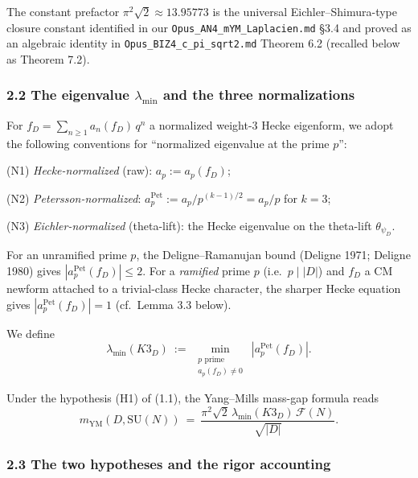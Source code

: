 \documentclass[
  11pt,
  a4paper,
]{amsart}
\begin{document}
The constant prefactor \(\pi^2 \sqrt{2} \approx 13.95773\) is the universal Eichler--Shimura-type closure constant identified in our \texttt{Opus\_AN4\_mYM\_Laplacien.md} §3.4 and proved as an algebraic identity in \texttt{Opus\_BIZ4\_c\_pi\_sqrt2.md} Theorem 6.2 (recalled below as Theorem 7.2).

\hypertarget{the-eigenvalue-lambda_min-and-the-three-normalizations}{%
\subsubsection{\texorpdfstring{2.2 The eigenvalue \(\lambda_{\min}\) and the three normalizations}{2.2 The eigenvalue \textbackslash lambda\_\{\textbackslash min\} and the three normalizations}}\label{the-eigenvalue-lambda_min-and-the-three-normalizations}}

For \(f_D = \sum_{n \ge 1} a_n(f_D)\, q^n\) a normalized weight-3 Hecke eigenform, we adopt the following conventions for ``normalized eigenvalue at the prime \(p\)'':

(N1) \emph{Hecke-normalized} (raw): \(a_p := a_p(f_D)\);

(N2) \emph{Petersson-normalized}: \(a_p^{\mathrm{Pet}} := a_p / p^{(k-1)/2} = a_p / p\) for \(k = 3\);

(N3) \emph{Eichler-normalized} (theta-lift): the Hecke eigenvalue on the theta-lift \(\theta_{\psi_D}\).

For an unramified prime \(p\), the Deligne--Ramanujan bound (Deligne 1971; Deligne 1980) gives \(|a_p^{\mathrm{Pet}}(f_D)| \le 2\). For a \emph{ramified} prime \(p\) (i.e.~\(p \mid |D|\)) and \(f_D\) a CM newform attached to a trivial-class Hecke character, the sharper Hecke equation gives \(|a_p^{\mathrm{Pet}}(f_D)| = 1\) (cf.~Lemma 3.3 below).

We define
\[
\lambda_{\min}(K3_D)\ :=\ \min_{\substack{p \text{ prime} \\ a_p(f_D) \ne 0}}\ |a_p^{\mathrm{Pet}}(f_D)|.
\tag{2.2}
\]

Under the hypothesis (H1) of (1.1), the Yang--Mills mass-gap formula reads
\[
m_{\mathrm{YM}}(D, \mathrm{SU}(N)) \ =\ \frac{\pi^2 \sqrt{2}\, \lambda_{\min}(K3_D)\, \mathcal{F}(N)}{\sqrt{|D|}}.
\tag{2.3}
\]

\hypertarget{the-two-hypotheses-and-the-rigor-accounting}{%
\subsubsection{2.3 The two hypotheses and the rigor accounting}\label{the-two-hypotheses-and-the-rigor-accounting}}
\end{document}
